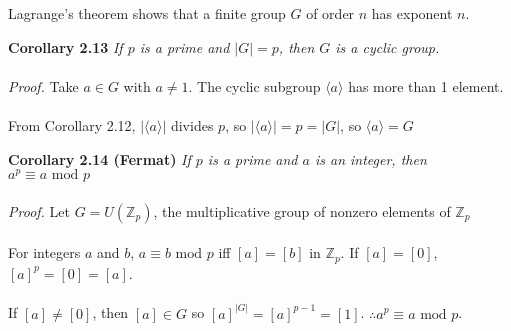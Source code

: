 \documentclass{article}
\begin{document}
Lagrange's theorem shows that a finite group \(G\) of order \(n\) has exponent \(n\).\\
\begin{greenrules}\color{OliveGreen}
\textbf{Corollary 2.13} \textit{If \(p\) is a prime and \(|G|=p\), then \(G\) is a cyclic group.}\\\\\color{black}
\textit{Proof.} Take \(a\in G\) with \(a\neq 1\). The cyclic subgroup \(\langle a\rangle\) has more than 1 element.\\\\
From \color{gray}Corollary 2.12\color{black}, \(|\langle a\rangle|\) divides \(p\), so \(|\langle a\rangle|=p=|G|\), so \(\langle a\rangle=G\)
\end{greenrules}
\begin{greenrules}\color{OliveGreen}
\textbf{Corollary 2.14 (Fermat)} \textit{If  \(p\) is a prime and \(a\) is an integer, then \(a^{p}\equiv a\text{ mod } p\)}\\\\\color{black}
\textit{Proof.} Let \(G=U(\mathbb{Z}_{p})\), the multiplicative group of nonzero elements of \(\mathbb{Z}_{p}\)\\\\
For integers \(a\) and \(b\), \(a\equiv b\text{ mod }p\) iff \([a]=[b]\) in \(\mathbb{Z}_{p}\). If \([a]=[0]\), \([a]^{p}=[0]=[a]\).\\\\
If \([a]\neq[0]\), then \([a]\in G\) so \([a]^{|G|}=[a]^{p-1}=[1]\). \(\therefore a^{p}\equiv a\text{ mod }p\).
\end{greenrules}
\end{document}
